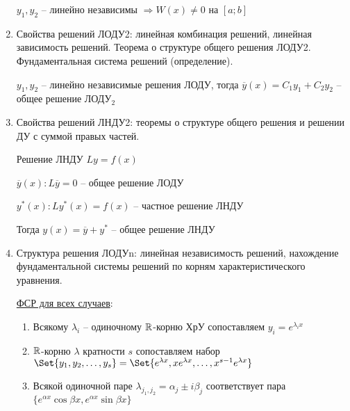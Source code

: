 \documentclass[12pt]{article}
\begin{document}
\begin{enumerate}
        \begin{MyTheorem}
             $y_1, y_2$ -- линейно независимы $\Longrightarrow W(x) \neq 0$ на $[a;b]$
        \end{MyTheorem}
    

        \item Свойства решений ЛОДУ2: линейная комбинация решений, линейная зависимость решений. Теорема о структуре общего решения ЛОДУ2. Фундаментальная система решений (определение).

        \begin{MyTheorem}
             $y_1, y_2$ -- линейно независимые решения ЛОДУ, тогда $\overline{y}(x) = C_1 y_1 + C_2 y_2$ -- общее решение ЛОДУ$_2$
        \end{MyTheorem}

        \item Свойства решений ЛНДУ2: теоремы о структуре общего решения и решении ДУ с суммой правых частей.

        \begin{MyTheorem}
             Решение ЛНДУ $Ly = f(x)$
    
            $\overline{y}(x): L\overline{y} = 0$ -- общее решение ЛОДУ
    
            $y^*(x): Ly^*(x) = f(x)$ -- частное решение ЛНДУ
    
            Тогда $y(x) = \overline{y} + y^*$ -- общее решение ЛНДУ
        \end{MyTheorem}


        \item Структура решения ЛОДУn: линейная независимость решений, нахождение фундаментальной системы решений по корням характеристического уравнения.

        \hyperlink{fssforlde2}{ФСР для всех случаев}:

        \begin{enumerate}
            \item Всякому $\lambda_i$ -- одиночному $\mathbb{R}$-корню ХрУ сопоставляем $y_i = e^{\lambda_i x}$
    
            \item $\mathbb{R}$-корню $\lambda$ кратности $s$ сопоставляем набор $\Set{y_1, y_2, \dots, y_s} = \Set{e^{\lambda x}, xe^{\lambda x}, \dots, x^{s - 1} e^{\lambda x}}$
    
            \item Всякой одиночной паре $\lambda_{j_1,j_2} = \alpha_j \pm i\beta_j$ соответствует пара $\{e^{\alpha x} \cos\beta x, e^{\alpha x} \sin\beta x\}$
    

\end{enumerate}
\end{enumerate}
\end{document}
